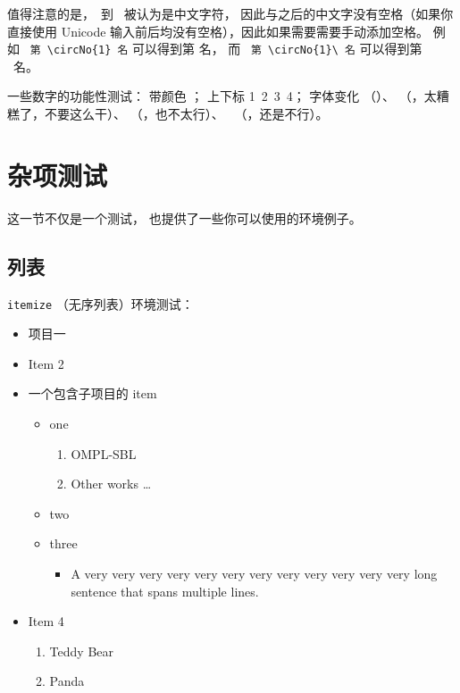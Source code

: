 值得注意的是，\ 到 \ 被认为是中文字符，
因此与之后的中文字没有空格（如果你直接使用 Unicode 输入前后均没有空格），因此如果需要需要手动添加空格。
例如 {\color{Blue}\ \verb|第 \circNo{1} 名|} 可以得到第  名，
而 {\color{Blue}\ \verb|第 \circNo{1}\ 名|} 可以得到第 \ 名。

一些数字的功能性测试：
带颜色 \textcolor{red}{     }；
上下标 1\textsuperscript{}\ 2\textsuperscript{}\ 3\textsubscript{}\ 4\textsubscript{}；
字体变化 \textsf{  }（\texttt{\string\ttfamily}）、
\textit{  }（\texttt{\string\itshape}，太糟糕了，不要这么干）、
\textbf{  }（\texttt{\string\bfseries}，也不太行）、
\texttt{  }（\texttt{\string\ttfamily}，还是不行）。

\section{杂项测试}
这一节不仅是一个测试，
也提供了一些你可以使用的环境例子。

\subsection{列表}
\texttt{itemize} （无序列表）环境测试：
\begin{itemize}
  \item 项目一
  \item Item 2
  \item 一个包含子项目的 item
  \begin{itemize}
    \item one
    \begin{enumerate}
      \item OMPL-SBL\cite{zhao2023ompl}
      \item Other works \dots
    \end{enumerate}
    \item two
    \item three
    \begin{itemize}
      \item A very very very very very very very very very very very very long sentence that spans multiple lines.
    \end{itemize}
  \end{itemize}
  \item Item 4
  \begin{enumerate}
    \item Teddy Bear
    \item Panda
  \end{enumerate}
\end{itemize}

